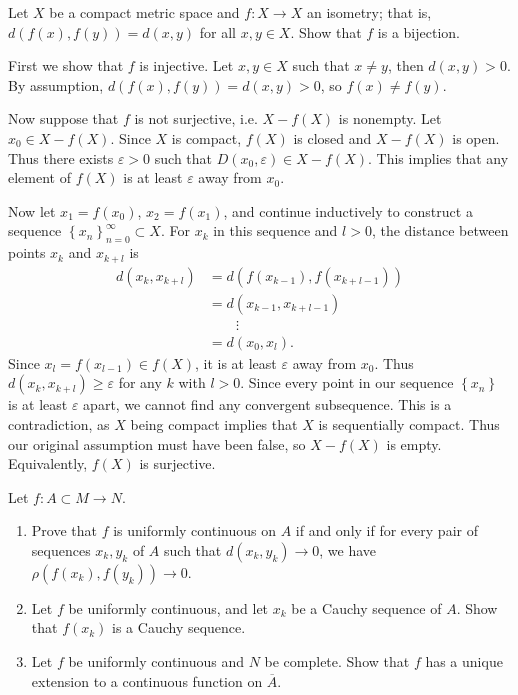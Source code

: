 \documentclass[10pt]{amsart}
\newenvironment{exercise}[1]{%
        \vspace{10mm}
        \renewcommand\themanualtheoreminner{#1}%
  \manualtheoreminner
}\hrulefill{\endmanualtheoreminner}
\begin{document}
\begin{exercise}{23}
	Let $X$ be a compact metric space and $f:X\to X$ an isometry; that is, $d(f(x),f(y)) = d(x,y)$ for all $x,y \in X$. Show that $f$ is a bijection.
\end{exercise}

First we show that $f$ is injective. Let $x,y \in X$ such that $x\neq y$, then $d(x,y)>0$. By assumption, $d(f(x),f(y)) = d(x,y) > 0$, so $f(x) \neq f(y)$.

Now suppose that $f$ is not surjective, i.e. $X - f(X)$ is nonempty. Let $x_0 \in X - f(X)$. Since $X$ is compact, $f(X)$ is closed and $X-f(X)$ is open. Thus there exists $\varepsilon>0$ such that $D(x_0,\varepsilon) \in X-f(X)$. This implies that any element of $f(X)$ is at least $\varepsilon$ away from $x_0$.

Now let $x_1 = f(x_0)$, $x_2 = f(x_1)$, and continue inductively to construct a sequence $\left\{ x_n \right\}_{n=0}^\infty \subset X$. For $x_k$ in this sequence and $l > 0$, the distance between points $x_{k}$ and $x_{k+l}$ is
\begin{align*}
	d(x_{k},x_{k+l}) &= d(f(x_{k-1}), f(x_{k+l-1})) \\
		   &= d(x_{k-1}, x_{k+l-1}) \\
		   & \quad\quad\vdots \\
		   &= d(x_0,x_l).
\end{align*}
Since $x_l = f(x_{l-1}) \in f(X)$, it is at least $\varepsilon$ away from $x_0$. Thus $d(x_k, x_{k+l}) \geq \varepsilon$ for any $k$ with $l > 0$. Since every point in our sequence $\left\{ x_n \right\}$ is at least $\varepsilon$ apart, we cannot find any convergent subsequence. This is a contradiction, as $X$ being compact implies that $X$ is sequentially compact. Thus our original assumption must have been false, so $X-f(X)$ is empty. Equivalently, $f(X)$ is surjective.

\begin{exercise}{24}
	Let $f:A\subset M\to N$.
	\begin{enumerate}
		\item Prove that $f$ is uniformly continuous on $A$ if and only if for every pair of sequences $x_k,y_k$ of $A$ such that $d(x_k,y_k)\to 0$, we have $\rho(f(x_k),f(y_k)) \to 0$.
		\item Let $f$ be uniformly continuous, and let $x_k$ be a Cauchy sequence of $A$. Show that $f(x_k)$ is a Cauchy sequence.
		\item Let $f$ be uniformly continuous and $N$ be complete. Show that $f$ has a unique extension to a continuous function on $\overline{A}$.
	\end{enumerate}
\end{exercise}
\end{document}
